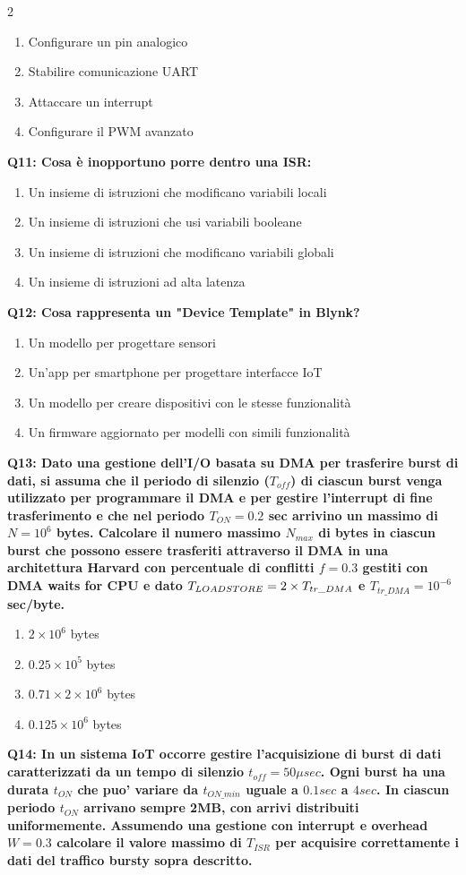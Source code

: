 \documentclass[10pt]{article}
\begin{document}
\begin{multicols}{2}
\begin{enumerate}[label=\arabic*.]
\item Configurare un pin analogico
\item Stabilire comunicazione UART
\item Attaccare un interrupt
\item Configurare il PWM avanzato
\end{enumerate}
\textbf{Q11: Cosa è inopportuno porre dentro una ISR:}

\begin{enumerate}[label=\arabic*.]
\item Un insieme di istruzioni che modificano variabili locali
\item Un insieme di istruzioni che usi variabili booleane
\item Un insieme di istruzioni che modificano variabili globali
\item Un insieme di istruzioni ad alta latenza
\end{enumerate}
\textbf{Q12: Cosa rappresenta un "Device Template" in Blynk?}

\begin{enumerate}[label=\arabic*.]
\item Un modello per progettare sensori
\item Un'app per smartphone per progettare interfacce IoT
\item Un modello per creare dispositivi con le stesse funzionalità
\item Un firmware aggiornato per modelli con simili funzionalità
\end{enumerate}
\textbf{Q13: Dato una gestione dell’I/O basata su DMA per trasferire burst di dati, si assuma che il periodo di silenzio  ($T_{off}$) di ciascun burst venga utilizzato per programmare il DMA e per gestire l’interrupt di fine trasferimento e che nel periodo $T_{ON} = 0.2$ sec arrivino un massimo di $N=10^6$ bytes. Calcolare il numero massimo $N_{max}$ di bytes in ciascun burst che possono essere trasferiti attraverso il DMA in una architettura Harvard con percentuale di conflitti $f = 0.3$ gestiti con DMA waits for CPU e dato $T_{LOAD\/STORE} = 2 \times T_{tr\_DMA}$ e $T_{tr\_DMA} = 10^{-6}$ sec/byte.}

\begin{enumerate}[label=\arabic*.]
\item $2 \times 10^6$ bytes
\item $0.25 \times 10^5$ bytes
\item $0.71 \times 2 \times 10^6$ bytes
\item $0.125 \times 10^6$ bytes
\end{enumerate}
\textbf{Q14: In un sistema IoT occorre gestire l'acquisizione di burst di dati caratterizzati da un tempo di silenzio $t_{off}=50\mu sec$. Ogni burst ha una durata $t_{ON}$ che puo' variare da $t_{ON\_min}$ uguale a $0.1 sec$ a $4 sec$. In ciascun periodo $t_{ON}$ arrivano sempre 2MB, con arrivi distribuiti uniformemente.  Assumendo una gestione con interrupt e overhead $W=0.3$ calcolare il valore massimo di $T_{ISR}$ per acquisire correttamente i dati del traffico bursty sopra descritto.}


\end{multicols}
\end{document}
